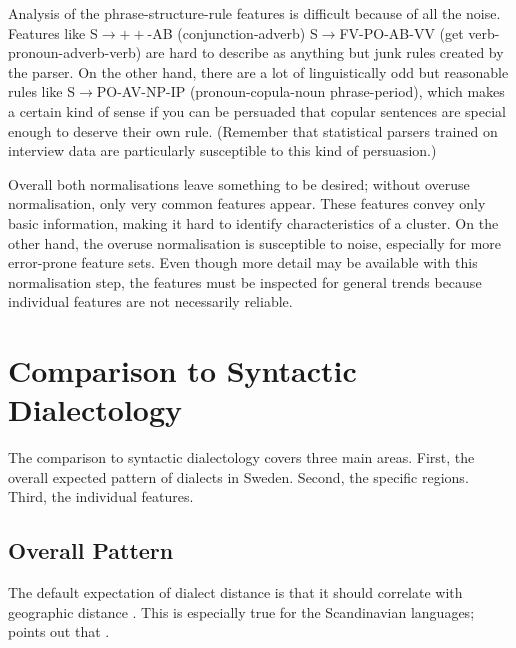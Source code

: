 Analysis of the phrase-structure-rule features is difficult because of
all the noise. Features like S$\to++$-AB (conjunction-adverb)
S$\to$FV-PO-AB-VV (get verb-pronoun-adverb-verb) are hard to describe
as anything but junk rules created by the parser. On the other hand,
there are a lot of linguistically odd but reasonable rules like
S$\to$PO-AV-NP-IP (pronoun-copula-noun phrase-period), which makes a
certain kind of sense if you can be persuaded that copular sentences
are special enough to deserve their own rule. (Remember that
statistical parsers trained on interview data are particularly
susceptible to this kind of persuasion.)

Overall both normalisations leave something to be desired; without
overuse normalisation, only very common features appear. These
features convey only basic information, making it hard to identify
characteristics of a cluster. On the other hand, the overuse
normalisation is susceptible to noise, especially for more error-prone
feature sets. Even though more detail may be available with this
normalisation step, the features must be inspected for general trends
because individual features are not necessarily reliable.

\section{Comparison to Syntactic Dialectology}

The comparison to syntactic dialectology covers three main
areas. First, the overall expected pattern of dialects in
Sweden. Second, the specific regions. Third, the individual features.

\subsection{Overall Pattern}

The default expectation of dialect distance is that it should
correlate with geographic distance \cite{goosken04a}. This is
especially true for the Scandinavian languages; 
points out that . 


